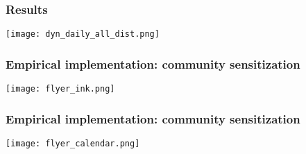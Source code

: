 \documentclass{beamer}
\theoremstyle{plain}
\begin{document}
\begin{frame}[label=slide105]
\frametitle{\large{Results}}
\begin{center}
\texttt{[image: dyn\_daily\_all\_dist.png]}
\end{center}
\end{frame}

\begin{frame}[label=slide106]
\frametitle{\large{Empirical implementation: community sensitization}}
\begin{center}
\texttt{[image: flyer\_ink.png]}
\end{center}
\end{frame}

\begin{frame}[label=slide107]
\frametitle{\large{Empirical implementation: community sensitization}}
\begin{center}
\texttt{[image: flyer\_calendar.png]}
\end{center}
\end{frame}
\end{document}
